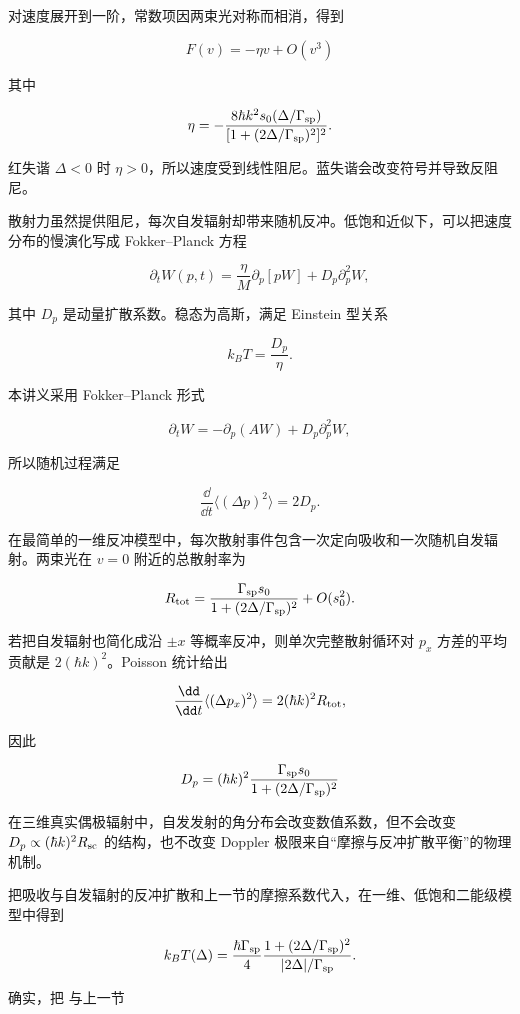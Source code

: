 对速度展开到一阶，常数项因两束光对称而相消，得到

\[
F(v)=-\eta v+O(v^3)
\]

其中

\[
\eta
=-\frac{8\hbar k^2s_0(\Delta/\Gamma_{\rm sp})}
{[1+(2\Delta/\Gamma_{\rm sp})^2]^2}.
\]

红失谐 \(\Delta<0\) 时 \(\eta>0\)，所以速度受到线性阻尼。蓝失谐会改变符号并导致反阻尼。

散射力虽然提供阻尼，每次自发辐射却带来随机反冲。低饱和近似下，可以把速度分布的慢演化写成 Fokker--Planck 方程

\[
\partial_t W(p,t)
=\frac{\eta}{M}\partial_p[pW]
+D_p\partial_p^2W,
\]

其中 \(D_p\) 是动量扩散系数。稳态为高斯，满足 Einstein 型关系

\[
k_BT=\frac{D_p}{\eta}.
\]

本讲义采用 Fokker--Planck 形式

\[
\partial_tW=-\partial_p(AW)+D_p\partial_p^2W,
\]

所以随机过程满足

\[
\frac{\dd}{\dd t}\langle(\Delta p)^2\rangle=2D_p.
\]

在最简单的一维反冲模型中，每次散射事件包含一次定向吸收和一次随机自发辐射。两束光在 \(v=0\) 附近的总散射率为

\[
R_{\rm tot}
=\frac{\Gamma_{\rm sp}s_0}
{1+(2\Delta/\Gamma_{\rm sp})^2}
+O(s_0^2).
\]

若把自发辐射也简化成沿 \(\pm x\) 等概率反冲，则单次完整散射循环对 \(p_x\) 方差的平均贡献是 \(2(\hbar k)^2\)。Poisson 统计给出

\[
\frac{\dd}{\dd t}\langle(\Delta p_x)^2\rangle
=2(\hbar k)^2R_{\rm tot},
\]

因此

\begin{equation}
D_p
=(\hbar k)^2
\frac{\Gamma_{\rm sp}s_0}
{1+(2\Delta/\Gamma_{\rm sp})^2}
\label{eq:doppler-diffusion}
\end{equation}

在三维真实偶极辐射中，自发发射的角分布会改变数值系数，但不会改变 \(D_p\propto(\hbar k)^2R_{\rm sc}\) 的结构，也不改变 Doppler 极限来自“摩擦与反冲扩散平衡”的物理机制。

把吸收与自发辐射的反冲扩散和上一节的摩擦系数代入，在一维、低饱和二能级模型中得到

\[
k_BT(\Delta)
=\frac{\hbar\Gamma_{\rm sp}}{4}
\frac{1+(2\Delta/\Gamma_{\rm sp})^2}
{|2\Delta|/\Gamma_{\rm sp}}.
\]

确实，把  与上一节

